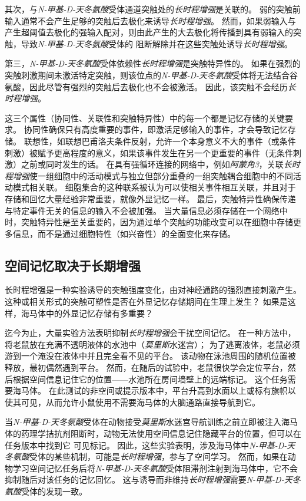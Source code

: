 其次，与\textit{N-甲基-D-天冬氨酸}受体通道突触处的\textit{长时程增强}是关联的。
弱的突触前输入通常不会产生足够的突触后去极化来诱导\textit{长时程增强}。
然而，如果弱输入与产生超阈值去极化的强输入配对，则由此产生的大去极化将传播到具有弱输入的突触，导致\textit{N-甲基-D-天冬氨酸}受体的  阻断解除并在这些突触处诱导\textit{长时程增强}。


第三，\textit{N-甲基-D-天冬氨酸}受体依赖性\textit{长时程增强}是突触特异性的。
如果在强烈的突触刺激期间未激活特定突触，则该位点的\textit{N-甲基-D-天冬氨酸}受体将无法结合谷氨酸，因此尽管有强烈的突触后去极化也不会被激活。
因此，该突触不会经历\textit{长时程增强}。


这三个属性（协同性、关联性和突触特异性）中的每一个都是记忆存储的关键要求。
协同性确保只有高度重要的事件，即激活足够输入的事件，才会导致记忆存储。
联想性，如联想巴甫洛夫条件反射，允许一个本身意义不大的事件（或条件刺激）被赋予更高程度的意义，如果该事件发生在另一个更重要的事件（无条件刺激）之前或同时发生的话。
在具有强循环连接的网络中，例如\textit{阿蒙角3}，关联\textit{长时程增强}使一组细胞中的活动模式与独立但部分重叠的一组突触耦合细胞中的不同活动模式相关联。
细胞集合的这种联系被认为可以使相关事件相互关联，并且对于存储和回忆大量经验非常重要，就像外显记忆一样。
最后，突触特异性确保传递与特定事件无关的信息的输入不会被加强。
当大量信息必须存储在一个网络中时，突触特异性是至关重要的，因为通过单个突触的功能改变可以在细胞中存储更多信息，而不是通过细胞特性（如兴奋性）的全面变化来存储。



\subsection{空间记忆取决于长期增强}

长时程增强是一种实验诱导的突触强度变化，由对神经通路的强烈直接刺激产生。
这种或相关形式的突触可塑性是否在外显记忆存储期间在生理上发生？
如果是这样，海马体中的外显记忆存储有多重要？


迄今为止，大量实验方法表明抑制\textit{长时程增强}会干扰空间记忆。
在一种方法中，将老鼠放在充满不透明液体的水池中（\textit{莫里斯}水迷宫）；
为了逃离液体，老鼠必须游到一个淹没在液体中并且完全看不见的平台。
该动物在泳池周围的随机位置被释放，最初偶然遇到平台。
然而，在随后的试验中，老鼠很快学会定位平台，然后根据空间信息记住它的位置——水池所在房间墙壁上的远端标记。
这个任务需要海马体。
在此测试的非空间或提示版本中，平台升高到水面以上或标有旗帜以使其可见，从而允许小鼠使用不需要海马体的大脑通路直接导航到它。


当\textit{N-甲基-D-天冬氨酸}受体在动物接受\textit{莫里斯}水迷宫导航训练之前立即被注入海马体的药理学拮抗剂阻断时，动物无法使用空间信息记住隐藏平台的位置，但可以在任务版本中找到它 可见标记。
因此，这些实验表明，涉及海马体中\textit{N-甲基-D-天冬氨酸}受体的某些机制，可能是\textit{长时程增强}，参与了空间学习。
然而，如果在动物学习空间记忆任务后将\textit{N-甲基-D-天冬氨酸}受体阻滞剂注射到海马体中，它不会抑制随后对该任务的记忆回忆。
这与诱导而非维持\textit{长时程增强}需要\textit{N-甲基-D-天冬氨酸}受体的发现一致。


